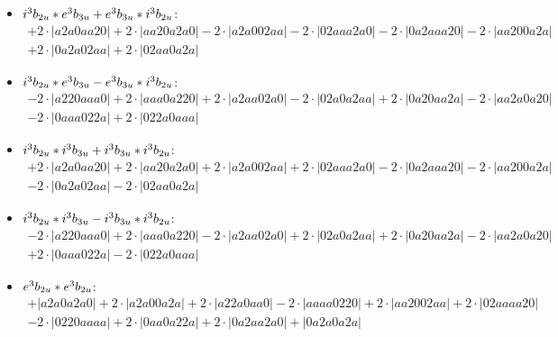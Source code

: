 \documentclass{article}
\begin{document}
\begin{itemize}
$$\begin{array}{c}
\end{array}$$
\item \boldmath$i^3 b_{2u} * e^3 b_{3u} + e^3 b_{3u} * i^3 b_{2u} \displaystyle $\unboldmath : \quad$$\begin{array}{c}
+2 \cdot \left|a2a0aa20\right| +2 \cdot \left|aa20a2a0\right| -2 \cdot \left|a2a002aa\right| -2 \cdot \left|02aaa2a0\right| -2 \cdot \left|0a2aaa20\right| -2 \cdot \left|aa200a2a\right| \\[0.5cm] +2 \cdot \left|0a2a02aa\right| +2 \cdot \left|02aa0a2a\right|
\end{array}$$
\item \boldmath$i^3 b_{2u} * e^3 b_{3u} - e^3 b_{3u} * i^3 b_{2u} \displaystyle $\unboldmath : \quad$$\begin{array}{c}
-2 \cdot \left|a220aaa0\right| +2 \cdot \left|aaa0a220\right| +2 \cdot \left|a2aa02a0\right| -2 \cdot \left|02a0a2aa\right| +2 \cdot \left|0a20aa2a\right| -2 \cdot \left|aa2a0a20\right| \\[0.5cm] -2 \cdot \left|0aaa022a\right| +2 \cdot \left|022a0aaa\right|
\end{array}$$
\item \boldmath$i^3 b_{2u} * i^3 b_{3u} + i^3 b_{3u} * i^3 b_{2u} \displaystyle $\unboldmath : \quad$$\begin{array}{c}
+2 \cdot \left|a2a0aa20\right| +2 \cdot \left|aa20a2a0\right| +2 \cdot \left|a2a002aa\right| +2 \cdot \left|02aaa2a0\right| -2 \cdot \left|0a2aaa20\right| -2 \cdot \left|aa200a2a\right| \\[0.5cm] -2 \cdot \left|0a2a02aa\right| -2 \cdot \left|02aa0a2a\right|
\end{array}$$
\item \boldmath$i^3 b_{2u} * i^3 b_{3u} - i^3 b_{3u} * i^3 b_{2u} \displaystyle $\unboldmath : \quad$$\begin{array}{c}
-2 \cdot \left|a220aaa0\right| +2 \cdot \left|aaa0a220\right| -2 \cdot \left|a2aa02a0\right| +2 \cdot \left|02a0a2aa\right| +2 \cdot \left|0a20aa2a\right| -2 \cdot \left|aa2a0a20\right| \\[0.5cm] +2 \cdot \left|0aaa022a\right| -2 \cdot \left|022a0aaa\right|
\end{array}$$
\item \boldmath$e^3 b_{2u} * e^3 b_{2u} \displaystyle $\unboldmath : \quad$$\begin{array}{c}
+\left|a2a0a2a0\right| +2 \cdot \left|a2a00a2a\right| +2 \cdot \left|a22a0aa0\right| -2 \cdot \left|aaaa0220\right| +2 \cdot \left|aa2002aa\right| +2 \cdot \left|02aaaa20\right| \\[0.5cm] -2 \cdot \left|0220aaaa\right| +2 \cdot \left|0aa0a22a\right| +2 \cdot \left|0a2aa2a0\right| +\left|0a2a0a2a\right|

\end{array}$$
\end{itemize}
\end{document}
